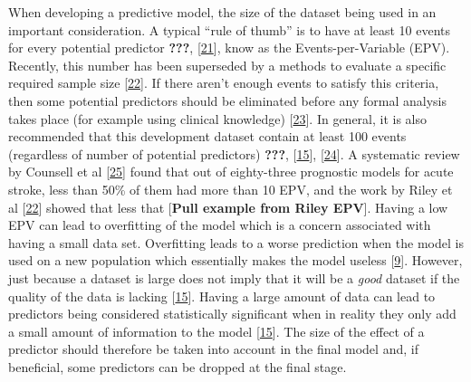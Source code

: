 \documentclass[
]{article}
\begin{document}
When developing a predictive model, the size of the dataset being used in an important consideration. A typical ``rule of thumb'' is to have at least 10 events for every potential predictor {\textbf{???}}, {[}\protect\hyperlink{ref-peduzzi_simulation_1996}{21}{]}, know as the Events-per-Variable (EPV). Recently, this number has been superseded by a methods to evaluate a specific required sample size {[}\protect\hyperlink{ref-riley_minimum_2019}{22}{]}. If there aren't enough events to satisfy this criteria, then some potential predictors should be eliminated before any formal analysis takes place (for example using clinical knowledge) {[}\protect\hyperlink{ref-sauerbrei_selection_2007}{23}{]}. In general, it is also recommended that this development dataset contain at least 100 events (regardless of number of potential predictors) {\textbf{???}}, {[}\protect\hyperlink{ref-riley_external_2016}{15}{]}, {[}\protect\hyperlink{ref-vergouwe_substantial_2005}{24}{]}. A systematic review by Counsell et al {[}\protect\hyperlink{ref-counsell_systematic_2001}{25}{]} found that out of eighty-three prognostic models for acute stroke, less than 50\% of them had more than 10 EPV, and the work by Riley et al {[}\protect\hyperlink{ref-riley_minimum_2019}{22}{]} showed that less that {[}\textbf{Pull example from Riley EPV}{]}. Having a low EPV can lead to overfitting of the model which is a concern associated with having a small data set. Overfitting leads to a worse prediction when the model is used on a new population which essentially makes the model useless {[}\protect\hyperlink{ref-royston_prognosis_2009}{9}{]}. However, just because a dataset is large does not imply that it will be a \emph{good} dataset if the quality of the data is lacking {[}\protect\hyperlink{ref-riley_external_2016}{15}{]}. Having a large amount of data can lead to predictors being considered statistically significant when in reality they only add a small amount of information to the model {[}\protect\hyperlink{ref-riley_external_2016}{15}{]}. The size of the effect of a predictor should therefore be taken into account in the final model and, if beneficial, some predictors can be dropped at the final stage.
\end{document}
